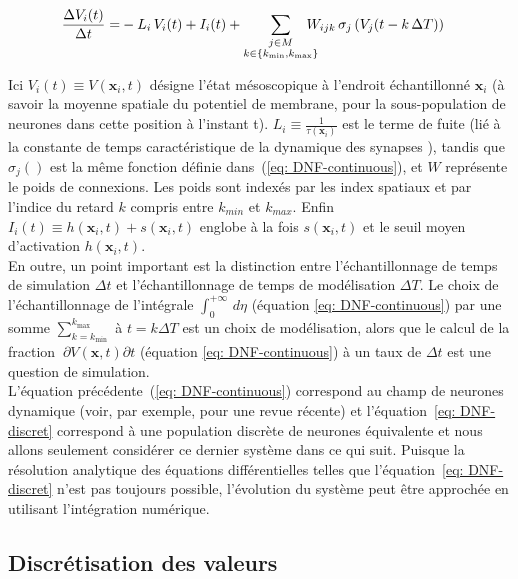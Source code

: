 \begin{align}
\label{eq: DNF-discret}
  \frac{\Delta V_i(t) }{\Delta t}  = &- L_i \, V_i(t)  + I_i(t)+\sum_{\substack{j \in M\\k \in \{k_{\min}, k_{\max}\}}} \hspace{-1em} W_{ijk} \, \sigma_j\left(V_j(t - k\, \Delta T)\right)
\end{align}

Ici $V_i(t) \equiv V(\mathbf{x}_i, t)$ désigne l'état mésoscopique à l'endroit échantillonné $\mathbf{x}_i$  (à savoir la moyenne spatiale du potentiel de membrane, pour la sous-population de neurones dans cette position à l'instant t). $L_i \equiv \frac{1}{\tau(\mathbf{x}_i)}$ est le terme de fuite (lié à la constante de temps caractéristique de la dynamique des synapses ), tandis que $\sigma_j()$ est la même fonction définie dans~(\ref{eq: DNF-continuous}), et $W$ représente le poids de connexions. Les poids sont indexés par les index spatiaux et par l'indice du retard $k$ compris entre $k_{min}$ et $k_{max}$. Enfin $I_i(t) \equiv h(\mathbf{x}_i, t) + s(\mathbf{x}_i, t)$ englobe à la fois $s(\mathbf{x}_i, t)$ et le seuil moyen d'activation $h(\mathbf{x}_i, t)$.\\

En outre, un point important est la distinction entre l'échantillonnage de temps de simulation $ \Delta t $ et l'échantillonnage de temps de modélisation $ \Delta T $. Le choix de l'échantillonnage de l'intégrale $ \int_0 ^ {+ \infty} \, d \eta $ (équation \ref{eq: DNF-continuous}) par une somme  $ \sum_ {k = k_ {\min}} ^ {k_ {\max}} $ à $ t = k \Delta T $  est un choix de modélisation, alors que le calcul de la fraction $ \ {\partial V (\mathbf {x}, t)} {\partial t} $ (équation \ref{eq: DNF-continuous}) à un taux de $ \Delta t $ est une question de simulation.\\

L'équation précédente~(\ref{eq: DNF-continuous}) correspond au champ de neurones dynamique (voir, par exemple, \cite{Grimbert:2008} pour une revue récente) et l'équation~\ref{eq: DNF-discret} correspond à une population discrète de neurones équivalente et nous allons seulement considérer ce dernier système dans ce qui suit. Puisque la résolution analytique des équations différentielles telles que l'équation~\ref{eq: DNF-discret} n'est pas toujours possible, l'évolution du système peut être approchée en utilisant l'intégration numérique. \\


\subsection{Discrétisation des valeurs}


